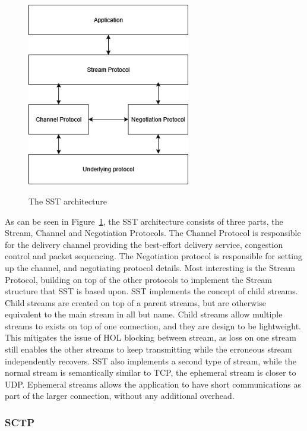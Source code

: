 \documentclass[english, 12pt, a4paper, elec, utf8, a-2b, online]{aaltothesis}
\begin{document}
\begin{figure}[h]
	\centering
	\includegraphics[alt={Diagra of the SST architecture.}, height=8cm]{./images/sst.png}
	\caption{The SST architecture}
	\label{fig:sst_arc}
\end{figure}

As can be seen in Figure~\ref{fig:sst_arc}, the SST architecture consists of three
parts, the Stream, Channel and Negotiation Protocols. The Channel Protocol is responsible
for the delivery channel providing the best-effort delivery service, congestion control
and packet sequencing. The Negotiation protocol is responsible for setting up the channel,
and negotiating protocol details. Most interesting is the Stream Protocol, building on
top of the other protocols to implement the Stream structure that SST is based upon.
SST implements the concept of child streams. Child streams are created on top of
a parent streams, but are otherwise equivalent to the main stream in all but name.
Child streams allow multiple streams to exists on top of one connection, and they
are design to be lightweight. This mitigates the issue of HOL blocking between stream,
as loss on one stream still enables the other streams to keep transmitting while
the erroneous stream independently recovers. SST also implements a second type of stream,
while the normal stream is semantically similar to TCP, the ephemeral stream is closer
to UDP. Ephemeral streams allows the application to have short communications as part
of the larger connection, without any additional overhead\cite{sst}.


\subsubsection{SCTP}
\end{document}
